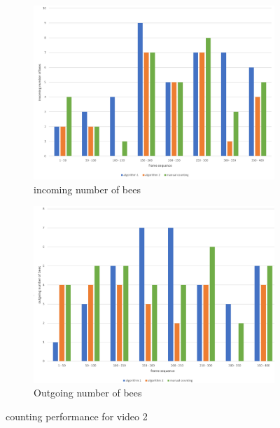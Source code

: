 \documentclass[10pt,twocolumn,letterpaper]{article}
\begin{document}
\begin{figure}[H]
\centering
    \begin{subfigure}[b]{0.35\textwidth}
        \includegraphics[width=\textwidth]{graphs/video2_incoming_number_of_bees}
        \caption{incoming number of bees}
        \label{fig:vdo2i}
    \end{subfigure}
    \begin{subfigure}[b]{0.35\textwidth}
        \includegraphics[width=\textwidth]{graphs/video2_outgoing_number_of_bees}
        \caption{Outgoing number of bees}
        \label{fig:vdo2o}
    \end{subfigure}
\caption{counting performance for video 2}
\label{fig:????}
\end{figure}
\end{document}
